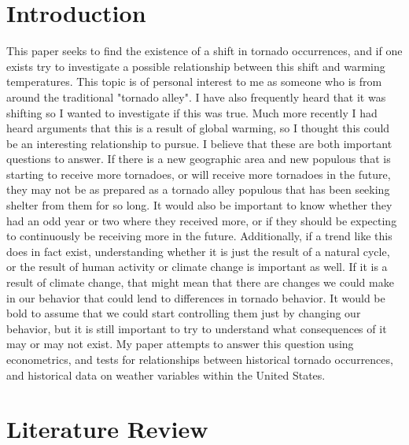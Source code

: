 \documentclass[12pt,english]{article}
\begin{document}
\section{Introduction}\label{sec:intro}
\hspace{1cm} This paper seeks to find the existence of a shift in tornado occurrences, and if one exists try to investigate a possible relationship between this shift and warming temperatures. This topic is of personal interest to me as someone who is from around the traditional "tornado alley". I have also frequently heard that it was shifting so I wanted to investigate if this was true. Much more recently I had heard arguments that this is a result of global warming, so I thought this could be an interesting relationship to pursue. I believe that these are both important questions to answer. If there is a new geographic area and new populous that is starting to receive more tornadoes, or will receive more tornadoes in the future, they may not be as prepared as a tornado alley populous that has been seeking shelter from them for so long. It would also be important to know whether they had an odd year or two where they received more, or if they should be expecting to continuously be receiving more in the future. Additionally, if a trend like this does in fact exist, understanding whether it is just the result of a natural cycle, or the result of human activity or climate change is important as well. If it is a result of climate change, that might mean that there are changes we could make in our behavior that could lend to differences in tornado behavior. It would be bold to assume that we could start controlling them just by changing our behavior, but it is still important to try to understand what consequences of it may or may not exist. My paper attempts to answer this question using econometrics, and tests for relationships between historical tornado occurrences, and historical data on weather variables within the United States. 

\section{Literature Review}\label{sec:litreview}
\end{document}

